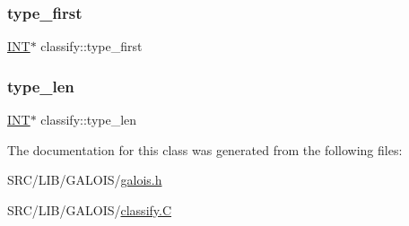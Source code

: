 \mbox{\label{classclassify_aea8eead047af96cea4ddcd00498882cb}} 
\subsubsection{\texorpdfstring{type\+\_\+first}{type\_first}}
{\footnotesize\ttfamily \mbox{\hyperlink{galois_8h_a09fddde158a3a20bd2dcadb609de11dc}{I\+NT}}$\ast$ classify\+::type\+\_\+first}

\mbox{\label{classclassify_aa154069de433b7b013b874427fd4d29f}} 
\subsubsection{\texorpdfstring{type\+\_\+len}{type\_len}}
{\footnotesize\ttfamily \mbox{\hyperlink{galois_8h_a09fddde158a3a20bd2dcadb609de11dc}{I\+NT}}$\ast$ classify\+::type\+\_\+len}



The documentation for this class was generated from the following files\+:\begin{DoxyCompactItemize}
\item 
S\+R\+C/\+L\+I\+B/\+G\+A\+L\+O\+I\+S/\mbox{\hyperlink{galois_8h}{galois.\+h}}\item 
S\+R\+C/\+L\+I\+B/\+G\+A\+L\+O\+I\+S/\mbox{\hyperlink{classify_8_c}{classify.\+C}}\end{DoxyCompactItemize}
